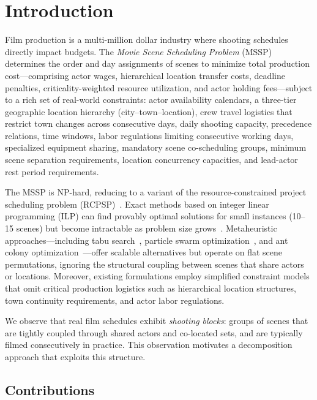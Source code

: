 \section{Introduction}
\label{sec:intro}

Film production is a multi-million dollar industry where shooting schedules directly impact budgets.
The \emph{Movie Scene Scheduling Problem} (MSSP) determines the order and day assignments of scenes to minimize total production cost---comprising actor wages, hierarchical location transfer costs, deadline penalties, criticality-weighted resource utilization, and actor holding fees---subject to a rich set of real-world constraints: actor availability calendars, a three-tier geographic location hierarchy (city--town--location), crew travel logistics that restrict town changes across consecutive days, daily shooting capacity, precedence relations, time windows, labor regulations limiting consecutive working days, specialized equipment sharing, mandatory scene co-scheduling groups, minimum scene separation requirements, location concurrency capacities, and lead-actor rest period requirements.

The MSSP is NP-hard, reducing to a variant of the resource-constrained project scheduling problem (RCPSP)~\citep{brucker1999}.
Exact methods based on integer linear programming (ILP) can find provably optimal solutions for small instances (10--15 scenes) but become intractable as problem size grows~\citep{liu2019, tekin2023}.
Metaheuristic approaches---including tabu search~\citep{liu2019}, particle swarm optimization~\citep{long2020, tekin2023}, and ant colony optimization~\citep{long2020}---offer scalable alternatives but operate on flat scene permutations, ignoring the structural coupling between scenes that share actors or locations.
Moreover, existing formulations employ simplified constraint models that omit critical production logistics such as hierarchical location structures, town continuity requirements, and actor labor regulations.

We observe that real film schedules exhibit \emph{shooting blocks}: groups of scenes that are tightly coupled through shared actors and co-located sets, and are typically filmed consecutively in practice.
This observation motivates a decomposition approach that exploits this structure.

\subsection{Contributions}


